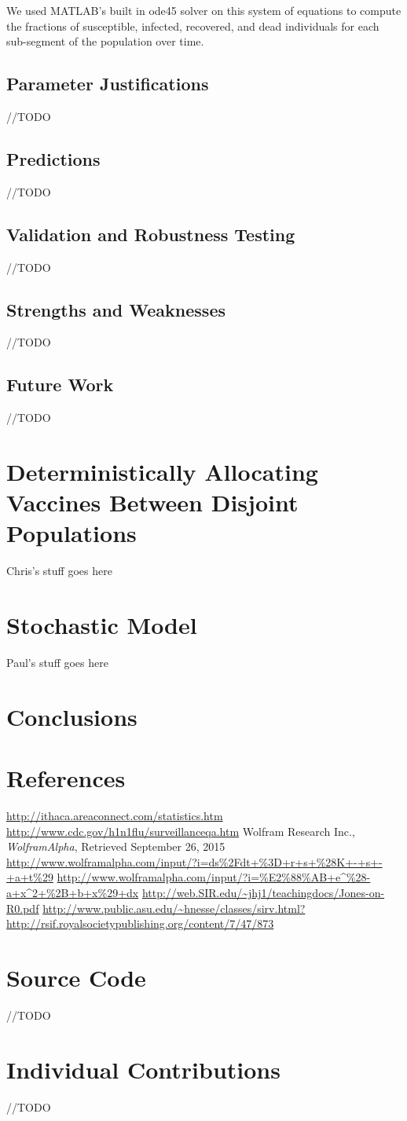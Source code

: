 \documentclass[titlepage]{article}
\begin{document}
	We used MATLAB's built in ode45 solver on this system of equations to compute the fractions of susceptible, infected, recovered, and dead individuals for each sub-segment of the population over time.
\subsection{Parameter Justifications}
	//TODO
\subsection{Predictions}
	//TODO
\subsection{Validation and Robustness Testing}
	//TODO
\subsection{Strengths and Weaknesses}
	//TODO
\subsection{Future Work}
	//TODO

\section{Deterministically Allocating Vaccines Between Disjoint Populations}
	Chris's stuff goes here

\section{Stochastic Model}
	Paul's stuff goes here

\section{Conclusions}

\section{References}
	\begin{thebibliography}{9}
		\url{http://ithaca.areaconnect.com/statistics.htm}
		\url{http://www.cdc.gov/h1n1flu/surveillanceqa.htm}
		Wolfram Research Inc.,
		\emph{WolframAlpha},
		Retrieved September 26, 2015
		\url{http://www.wolframalpha.com/input/?i=ds%2Fdt+%3D+r+s+%28K+-+s+-+a+t%29}
		\url{http://www.wolframalpha.com/input/?i=%E2%88%AB+e^%28-a+x^2+%2B+b+x%29+dx}
		\url{http://web.SIR.edu/~jhj1/teachingdocs/Jones-on-R0.pdf}
		\url{http://www.public.asu.edu/~hnesse/classes/sirv.html?}
		\url{http://rsif.royalsocietypublishing.org/content/7/47/873}
	\end{thebibliography}

\section{Source Code}
	//TODO
\section{Individual Contributions}
	//TODO
\end{document}
